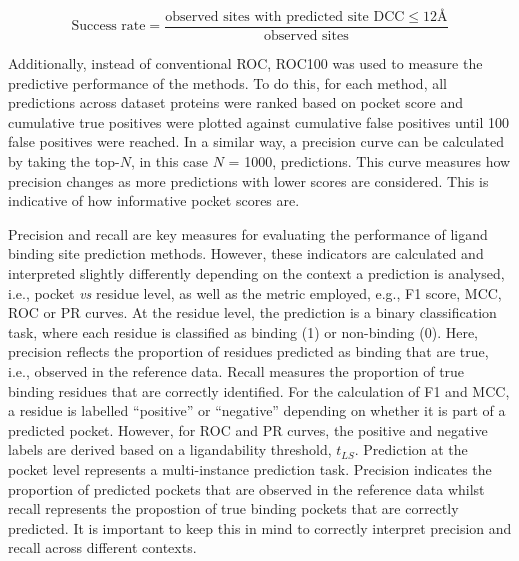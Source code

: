\begin{equation}
\text{Success rate} = \frac{\text{observed sites with predicted site DCC} \leq 12 \text{Å}}{\text{observed sites}}
\label{eq:success_rate}
\end{equation}

Additionally, instead of conventional ROC, ROC100 \cite{WEBBER_2003_ROC100, SCOTT_2007_ROC100} was used to measure the predictive performance of the methods. To do this, for each method, all predictions across dataset proteins were ranked based on pocket score and cumulative true positives were plotted against cumulative false positives until 100 false positives were reached. In a similar way, a precision curve can be calculated by taking the top-$N$, in this case $N$ = 1000, predictions. This curve measures how precision changes as more predictions with lower scores are considered. This is indicative of how informative pocket scores are.

Precision and recall are key measures for evaluating the performance of ligand binding site prediction methods. However, these indicators are calculated and interpreted slightly differently depending on the context a prediction is analysed, i.e., pocket \textit{vs} residue level, as well as the metric employed, e.g., F1 score, MCC, ROC or PR curves. At the residue level, the prediction is a binary classification task, where each residue is classified as binding (1) or non-binding (0). Here, precision reflects the proportion of residues predicted as binding that are true, i.e., observed in the reference data. Recall measures the proportion of true binding residues that are correctly identified. For the calculation of F1 and MCC, a residue is labelled ``positive'' or ``negative'' depending on whether it is part of a predicted pocket. However, for ROC and PR curves, the positive and negative labels are derived based on a ligandability threshold, $t_{LS}$. Prediction at the pocket level represents a multi-instance prediction task. Precision indicates the proportion of predicted pockets that are observed in the reference data whilst recall represents the propostion of true binding pockets that are correctly predicted. It is important to  keep this in mind to correctly interpret precision and recall across different contexts.

